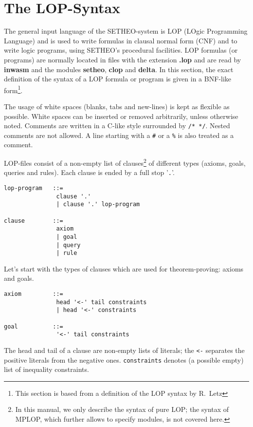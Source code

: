 %

\section{The LOP-Syntax}
\label{sec:lop-syntax}

The general input language of the SETHEO-system is
LOP (LOgic Programming Language) and is used to write
formulas in clausal normal form (CNF) and to write logic
programs, using SETHEO's procedural facilities.
LOP formulas (or programs) are normally located in files
with the extension {\bf .lop} and are read by {\bf inwasm}
and the modules {\bf setheo}, {\bf clop} and {\bf delta}.
In this section, the exact definition of the syntax of a LOP
formula or program is given in a BNF-like form\footnote{
	This section is based from a definition of the LOP
	syntax by R.~Letz
}.

The usage of white spaces (blanks, tabs and new-lines) is
kept as flexible as possible. White spaces can be inserted or
removed arbitrarily, unless otherwise noted.
Comments are written in a C-like style surrounded
by {\tt /* */}.  Nested comments are not allowed.
A line starting with a {\tt \#} or a {\tt \%} is also treated as a comment.

LOP-files consist of a non-empty list of clauses\footnote{
	In this manual, we only describe the syntax of pure
	LOP; the syntax of MPLOP, which further allows to specify
	modules, is not covered here.}
of different types (axioms, goals, queries and rules).
Each clause is ended by a full stop '{\tt .}'.

\begin{verbatim}
lop-program   ::=
               clause '.'
               | clause '.' lop-program

clause        ::=
               axiom
               | goal
               | query
               | rule
\end{verbatim}

Let's start with the types of clauses which are used for
theorem-proving: axioms and goals.
\begin{verbatim}
axiom         ::=
               head '<-' tail constraints
               | head '<-' constraints

goal          ::=
               '<-' tail constraints
\end{verbatim}
The head and tail of a clause are non-empty lists of literals;
the {\tt <-} separates the positive literals from the negative
ones.
{\tt constraints} denotes (a possible empty) list of
inequality constraints.

